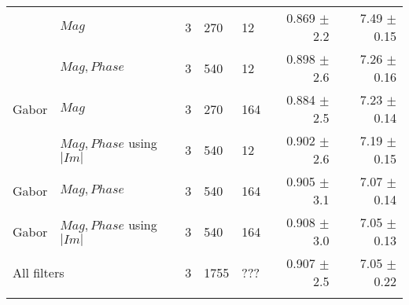 \begin{tabularx}{\linewidth}{p{3cm} X X X X r r}
\dtcwt{}& $Mag$                     & 3 &   270 &  12   & 0.869 $\pm$ 2.2   & 7.49 $\pm$ 0.15 \\
\dtcwt{}& $Mag,Phase$               & 3 &   540 &  12   & 0.898 $\pm$ 2.6   & 7.26 $\pm$ 0.16 \\
Gabor   & $Mag$                     & 3 &   270 & 164   & 0.884 $\pm$ 2.5   & 7.23 $\pm$ 0.14 \\
\dtcwt{}& $Mag, Phase$ using $|Im|$ & 3 &   540 &  12   & 0.902 $\pm$ 2.6   & 7.19 $\pm$ 0.15 \\

Gabor   & $Mag,Phase$               & 3 &   540 & 164   & 0.905 $\pm$ 3.1   & 7.07 $\pm$ 0.14 \\

Gabor   & $Mag, Phase$ using $|Im|$ & 3 &   540 & 164   & 0.908 $\pm$ 3.0   & 7.05 $\pm$ 0.13 \\

\multicolumn{2}{l}{All filters}     & 3 &  1755 & ???   & 0.907 $\pm$ 2.5   & 7.05 $\pm$ 0.22 \\

\bottomrule
\noalign{\smallskip}
\end{tabularx}
